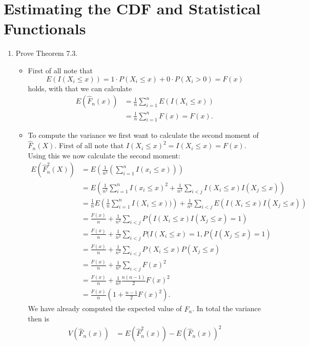 \documentclass{article}
\begin{document}
\section{Estimating the CDF and Statistical Functionals}
\begin{enumerate}
	\item Prove Theorem 7.3.
		\begin{itemize}
			\item First of all note that
			$$
			E(I(X_i \leq x)) = 1 \cdot P(X_i \leq x) + 0 \cdot P(X_i > 0) = F(x)
			$$
			holds, with that we can calculate
			$$
			\begin{aligned}
			E(\hat{F}_n(x)) &= \frac{1}{n} \sum_{i = 1}^n E(I(X_i \leq x)) \\
			&= \frac{1}{n} \sum_{i = 1}^n F(x) = F(x).
			\end{aligned}
			$$
			\item To compute the variance we first want to calculate the second moment of $\hat{F}_n(X)$. First of all note that $I(X_i \leq x)^2 = I(X_i \leq x) = F(x)$. Using this we now calculate the second moment:
			$$
			\begin{aligned}
			E(\hat{F}_n^2(X)) &= E\left( \frac{1}{n^2} \left( \sum_{i = 1}^n I(x_i \leq x) \right)\right) \\
			&= E\left( \frac{1}{n^2} \sum_{i = 1}^n I(x_i \leq x)^2 + \frac{1}{n^2} \sum_{i < j} I(X_i \leq x)I(X_j \leq x) \right) \\
			&= \frac{1}{n} E\left( \frac{1}{n} \sum_{i = 1}^n I(X_i \leq x)) \right) + \frac{1}{n^2} \sum_{i < j} E(I(X_i \leq x)I(X_j \leq x)) \\
			&= \frac{F(x)}{n} + \frac{1}{n^2} \sum_{i < j} P(I(X_i \leq x)I(X_j \leq x) = 1) \\
			&= \frac{F(x)}{n} + \frac{1}{n^2} \sum_{i < j} P(I(X_i \leq x) = 1, P(I(X_j \leq x) = 1) \\
			&= \frac{F(x)}{n} + \frac{1}{n^2} \sum_{i < j} P(X_i \leq x)P(X_j \leq x) \\
			&= \frac{F(x)}{n} + \frac{1}{n^2} \sum_{i < j} F(x)^2 \\
			&= \frac{F(x)}{n} + \frac{1}{n^2} \frac{n(n - 1)}{2} F(x)^2 \\
			&= \frac{F(x)}{n}\left(1 + \frac{n - 1}{2} F(x)^2 \right).
			\end{aligned}
			$$
			We have already computed the expected value of $\hat{F}_n$. In total the variance then is
			$$
			\begin{aligned}
			V(\hat{F}_n(x)) &= E(\hat{F}_n^2(x)) - E(\hat{F}_n(x))^2 \\

\end{aligned}$$
\end{itemize}
\end{enumerate}
\end{document}
